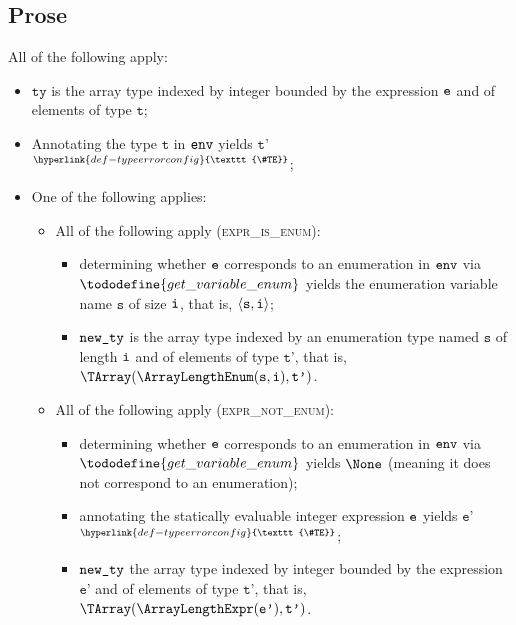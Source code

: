 \documentclass{book}
\newcommand\TypeErrorConfig[0]{\hyperlink{def-typeerrorconfig}{\texttt{\#TE}}}
\newcommand\ProseOrTypeError[0]{\hyperlink{def-proseortypeerror}{$^{\TypeErrorConfig}$}}
\newcommand\vt[0]{\texttt{t}}
\newcommand\vs[0]{\texttt{s}}
\newcommand\tty[0]{\texttt{ty}}
\newcommand\vep[0]{\texttt{e'}}
\newcommand\vtp[0]{\texttt{t'}}
\begin{document}
\subsection{Prose}
All of the following apply:
\begin{itemize}
  \item $\tty$ is the array type indexed by integer bounded by the
    expression $\texttt{e}$ and of elements of type $\vt$;
  \item Annotating the type $\vt$ in $\texttt{env}$ yields $\vtp$ \ProseOrTypeError;
  \item One of the following applies:
  \begin{itemize}
    \item All of the following apply (\textsc{expr\_is\_enum}):
    \begin{itemize}
      \item determining whether $\texttt{e}$ corresponds to an enumeration in $\texttt{env}$
      via \\ $\tododefine{get\_variable\_enum}$ yields the enumeration variable
      name $\vs$ of size $\texttt{i}$, that is, $\langle \vs, \vi \rangle$;
      \item $\texttt{new\_ty}$ is the array type indexed by an enumeration type
      named $\vs$ of length $\texttt{i}$ and of elements of type $\vtp$, that is, $\TArray(\ArrayLengthEnum(\vs, \vi), \vtp)$.
    \end{itemize}

    \item All of the following apply (\textsc{expr\_not\_enum}):
    \begin{itemize}
      \item determining whether $\texttt{e}$ corresponds to an enumeration in $\texttt{env}$
      via \\ $\tododefine{get\_variable\_enum}$ yields $\None$ (meaning it does not
      correspond to an enumeration);
      \item annotating the statically evaluable integer expression $\texttt{e}$ yields
      $\vep$ \ProseOrTypeError;
      \item $\texttt{new\_ty}$ the array type indexed by integer bounded by
      the expression $\vep$ and of elements of type $\vtp$, that is,
      $\TArray(\ArrayLengthExpr(\vep), \vtp)$.
    \end{itemize}


\end{itemize}
\end{itemize}
\end{document}
